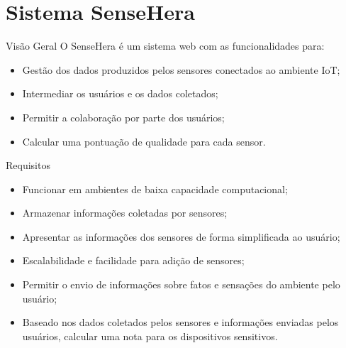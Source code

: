 \documentclass{beamer}
\begin{document}
  \section{Sistema SenseHera}
  \begin{frame}{Visão Geral}
    O SenseHera é um sistema web com as funcionalidades para:
    \begin{itemize}
      \item Gestão dos dados produzidos pelos sensores conectados ao ambiente IoT;
      \item Intermediar os usuários e os dados coletados;
      \item Permitir a colaboração por parte dos usuários;
      \item Calcular uma pontuação de qualidade para cada sensor.
    \end{itemize}
  \end{frame}

  \begin{frame}{Requisitos}
    \begin{itemize}
      \item Funcionar em ambientes de baixa capacidade computacional;
      \item Armazenar informações coletadas por sensores;
      \item Apresentar as informações dos sensores de forma simplificada ao usuário;
      \item Escalabilidade e facilidade para adição de sensores;
      \item Permitir o envio de informações sobre fatos e sensações do ambiente pelo usuário;
      \item Baseado nos dados coletados pelos sensores e informações enviadas pelos usuários, calcular uma nota para os dispositivos sensitivos.
    \end{itemize}
  \end{frame}
\end{document}
